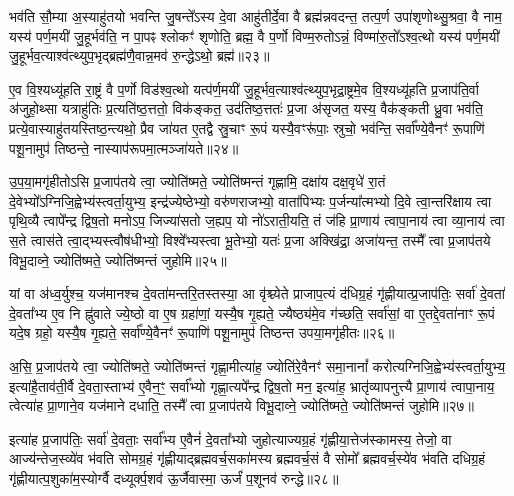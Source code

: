 भव॑ति सौ॒म्या अ॒स्याहु॑तयो भवन्ति जु॒षन्ते᳚\-ऽस्य दे॒वा आहु॑तीर्दे॒वा वै ब्रह्म॑न्नवदन्त॒ तत्प॒र्ण उपा॑शृणोथ्सु॒श्रवा॒ वै नाम॒ यस्य॑ पर्ण॒मयी॑ जु॒हूर्भव॑ति॒ न पा॒पꣴ श्लोकꣳ॑ शृणोति॒ ब्रह्म॒ वै प॒र्णो विण्म॒रुतो\-ऽन्नं॒ विण्मा॑रु॒तो᳚\-ऽश्व॒त्थो यस्य॑ पर्ण॒मयी॑ जु॒हूर्भव॒त्याश्व॑त्थ्युप॒भृद्ब्रह्म॑णै॒वान्न॒मव॑ रु॒न्द्धे\-ऽथो॒ ब्रह्म॑॥२३॥

ए॒व वि॒श्यध्यू॑हति रा॒ष्ट्रं वै प॒र्णो विड॑श्व॒त्थो यत्प॑र्ण॒मयी॑ जु॒हूर्भव॒त्याश्व॑त्थ्युप॒भृद्रा॒ष्ट्रमे॒व वि॒श्यध्यू॑हति प्र॒जाप॑ति॒र्वा अ॑जुहो॒थ्सा यत्राहु॑तिः प्र॒त्यति॑ष्ठ॒त्ततो॒ विक॑ङ्कत॒ उद॑तिष्ठ॒त्ततः॑ प्र॒जा अ॑सृजत॒ यस्य॒ वैक॑ङ्कती ध्रु॒वा भव॑ति॒ प्रत्ये॒वास्याहु॑तयस्तिष्ठ॒न्त्यथो॒ प्रैव जा॑यत ए॒तद्वै स्रु॒चाꣳ रू॒पं यस्यै॒वꣳरू॑पाः॒ स्रुचो॒ भव॑न्ति॒ सर्वा᳚ण्ये॒वैनꣳ॑ रू॒पाणि॑ पशू॒नामुप॑ तिष्ठन्ते॒ नास्याप॑रूपमा॒त्मञ्जा॑यते॥२४॥

{\anuvakamend[{जु॒हूरथो॒ ब्रह्म॑ स्रु॒चाꣳ स॒प्तद॑श च॥७॥}]}

उ॒प॒या॒मगृ॑हीतो\-ऽसि प्र॒जाप॑तये त्वा॒ ज्योति॑ष्मते॒ ज्योति॑ष्मन्तं गृह्णामि॒ दक्षा॑य दक्ष॒वृधे॑ रा॒तं दे॒वेभ्यो᳚\-ऽग्निजि॒ह्वेभ्य॑\-स्त्वर्ता॒युभ्य॒ इन्द्र॑ज्येष्ठेभ्यो॒ वरु॑णराजभ्यो॒ वाता॑पिभ्यः प॒र्जन्या᳚त्मभ्यो दि॒वे त्वा॒न्तरि॑क्षाय त्वा पृथि॒व्यै त्वापे᳚न्द्र द्विष॒तो मनो\-ऽप॒ जिज्या॑सतो ज॒ह्यप॒ यो नो॑\-ऽराती॒यति॒ तं ज॑हि प्रा॒णाय॑ त्वापा॒नाय॑ त्वा व्या॒नाय॑ त्वा स॒ते त्वास॑ते त्वा॒द्भ्यस्त्वौष॑धीभ्यो॒ विश्वे᳚भ्यस्त्वा भू॒तेभ्यो॒ यतः॑ प्र॒जा अक्खि॑द्रा॒ अजा॑यन्त॒ तस्मै᳚ त्वा प्र॒जाप॑तये विभू॒दाव्ने॒ ज्योति॑ष्मते॒ ज्योति॑ष्मन्तं जुहोमि॥२५॥

{\anuvakamend[{ओष॑धीभ्य॒श्चतु॑र्दश च॥८॥}]}

यां वा अ॑ध्व॒र्युश्च॒ यज॑मानश्च दे॒वता॑मन्तरि॒तस्तस्या॒ आ वृ॑श्च्येते प्राजाप॒त्यं द॑धिग्र॒हं गृ॑ह्णीयात्प्र॒जाप॑तिः॒ सर्वा॑ दे॒वता॑ दे॒वता᳚भ्य ए॒व नि ह्नु॑वाते ज्ये॒ष्ठो वा ए॒ष ग्रहा॑णां॒ यस्यै॒ष गृ॒ह्यते॒ ज्यैष्ठ्य॑मे॒व ग॑च्छति॒ सर्वा॑सां॒ वा ए॒तद्दे॒वता॑नाꣳ रू॒पं यदे॒ष ग्रहो॒ यस्यै॒ष गृ॒ह्यते॒ सर्वा᳚ण्ये॒वैनꣳ॑ रू॒पाणि॑ पशू॒नामुप॑ तिष्ठन्त उपया॒मगृ॑हीतः॥२६॥

अ॒सि॒ प्र॒जाप॑तये त्वा॒ ज्योति॑ष्मते॒ ज्योति॑ष्मन्तं गृह्णा॒मीत्या॑ह॒ ज्योति॑रे॒वैनꣳ॑ समा॒नानां᳚ करोत्यग्निजि॒ह्वेभ्य॑स्त्वर्ता॒युभ्य॒ इत्या॑है॒ताव॑ती॒र्वै दे॒वता॒स्ताभ्य॑ ए॒वैन॒ꣳ॒ सर्वा᳚भ्यो गृह्णा॒त्यपे᳚न्द्र द्विष॒तो मन॒ इत्या॑ह॒ भ्रातृ॑व्यापनुत्त्यै प्रा॒णाय॑ त्वापा॒नाय॒ त्वेत्या॑ह प्रा॒णाने॒व यज॑माने दधाति॒ तस्मै᳚ त्वा प्र॒जाप॑तये विभू॒दाव्ने॒ ज्योति॑ष्मते॒ ज्योति॑ष्मन्तं जुहोमि॥२७॥

इत्या॑ह प्र॒जाप॑तिः॒ सर्वा॑ दे॒वताः॒ सर्वा᳚भ्य ए॒वैनं॑ दे॒वता᳚भ्यो जुहोत्याज्यग्र॒हं गृ॑ह्णीया॒त्तेज॑स्कामस्य॒ तेजो॒ वा आज्य॑न्तेज॒स्व्ये॑व भ॑वति सोमग्र॒हं गृ॑ह्णीयाद्ब्रह्मवर्च॒सका॑मस्य ब्रह्मवर्च॒सं वै सोमो᳚ ब्रह्मवर्च॒स्ये॑व भ॑वति दधिग्र॒हं गृ॑ह्णीयात्प॒शुका॑म॒स्योर्ग्वै दध्यूर्क्प॒शव॑ ऊ॒र्जैवास्मा॒ ऊर्जं॑ प॒शूनव॑ रुन्द्धे॥२८॥


